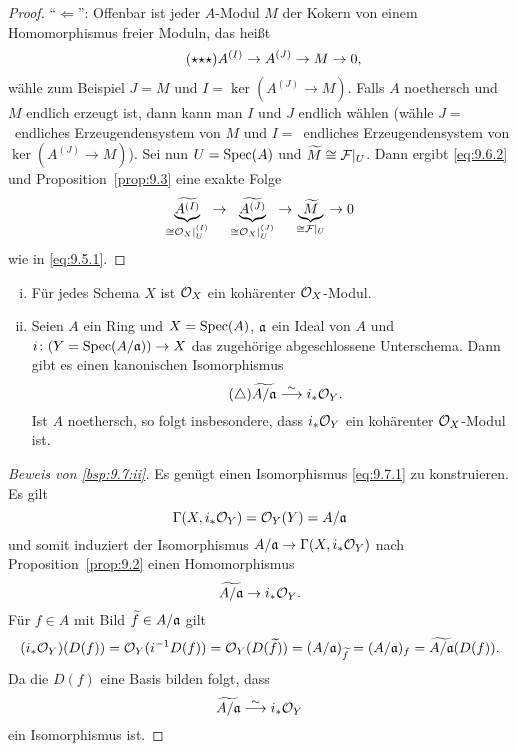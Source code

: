 \begin{prop}
\begin{proof}
		\enquote{$\Longleftarrow$}: Offenbar ist jeder $A$-Modul $M$ der Kokern von einem Homomorphismus freier Moduln, das heißt
		\begin{equation*}
		\label{eq:9.6.2}\tag{$\star{\star}\star$}
			A^{(I)} \to A^{(J)} \to M \to 0,
		\end{equation*}
		wähle zum Beispiel $J=M$ und $I = \ker(A^{(J)}\to M)$. Falls $A$ noethersch und $M$ endlich erzeugt ist, dann kann man $I$ und $J$ endlich wählen (wähle $J=$~endliches Erzeugendensystem von $M$ und $I=$~endliches Erzeugendensystem von $\ker(A^{(J)}\to M)$). Sei nun $U=\operatorname{Spec}(A)$ und $\widetilde{M}\cong \mathcal{F}\vert_U$. Dann ergibt \eqref{eq:9.6.2} und Proposition~\ref{prop:9.3} eine exakte Folge
		\[
			\underbrace{\widetilde{A^{(I)}}}_{\cong \mathcal{O}_X\vert_U^{(I)}} \to \underbrace{\widetilde{A^{(J)}}}_{\cong \mathcal{O}_X\vert_U^{(J)}}\to \underbrace{\widetilde{M}}_{\cong \mathcal{F}\vert_U} \to 0
		\]
		wie in \eqref{eq:9.5.1}.
	\end{proof}
\end{prop}

\begin{bsp}
\label{bsp:9.7}
	\begin{enumerate}[i)]
		\item Für jedes Schema $X$ ist $\mathcal{O}_X$ ein kohärenter $\mathcal{O}_X$-Modul.
		\item\label{bsp:9.7:ii} Seien $A$ ein Ring und $X=\operatorname{Spec}(A)$, $\mathfrak{a}$ ein Ideal von $A$ und $i\colon (Y=\operatorname{Spec}(A/\mathfrak{a}))\to X$ das zugehörige abgeschlossene Unterschema. Dann gibt es einen kanonischen Isomorphismus
		\begin{equation*}
		\label{eq:9.7.1}\tag{$\triangle$}
			\widetilde{A/\mathfrak{a}} \overset{\sim}{\longrightarrow} i_*\mathcal{O}_Y.
		\end{equation*}
		Ist $A$ noethersch, so folgt insbesondere, dass $i_*\mathcal{O}_Y$ ein kohärenter $\mathcal{O}_X$-Modul ist.
	\end{enumerate}
	\begin{proof}[Beweis von \ref{bsp:9.7:ii}]
		Es genügt einen Isomorphismus \eqref{eq:9.7.1} zu konstruieren. Es gilt
		\[
			\Gamma(X,i_*\mathcal{O}_Y)=\mathcal{O}_Y(Y) =A/\mathfrak{a}
		\]
		und somit induziert der Isomorphismus $A/\mathfrak{a} \to \Gamma(X,i_*\mathcal{O}_Y)$ nach Proposition~\ref{prop:9.2} einen Homomorphismus
		\[
			\widetilde{A/\mathfrak{a}} \to i_*\mathcal{O}_Y.
		\]
		Für $f \in A$ mit Bild $\widetilde{f}\in A/\mathfrak{a}$ gilt
		\[
			(i_*\mathcal{O}_Y)(D(f)) = \mathcal{O}_Y(i^{-1}D(f)) = \mathcal{O}_Y(D(\widetilde{f})) = (A/\mathfrak{a})_{\widetilde{f}} = (A/\mathfrak{a})_f = \widetilde{A/\mathfrak{a}}(D(f)).
		\]
		Da die $D(f)$ eine Basis bilden folgt, dass
		\[
			\widetilde{A/\mathfrak{a}} \overset{\sim}{\longrightarrow} i_*\mathcal{O}_Y
		\]
		ein Isomorphismus ist.
	\end{proof}
\end{bsp}

